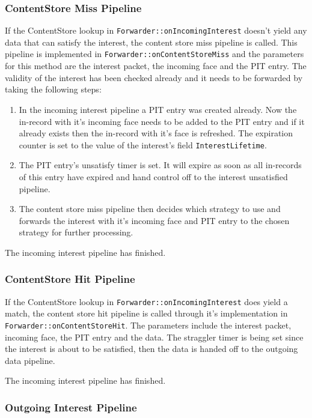 \subsubsection{ContentStore Miss Pipeline}

If the ContentStore lookup in \texttt{Forwarder::onIncomingInterest} doesn't yield any data that can satisfy the interest, the content store miss pipeline is called. This pipeline is implemented in \texttt{Forwarder::onContentStoreMiss} and the parameters for this method are the interest packet, the incoming face and the PIT entry. The validity of the interest has been checked already and it needs to be forwarded by taking the following steps:

\begin{enumerate}
\item In the incoming interest pipeline a PIT entry was created already. Now the in-record with it's incoming face needs to be added to the PIT entry and if it already exists then the in-record with it's face is refreshed. The expiration counter is set to the value of the interest's field \texttt{InterestLifetime}.
\item The PIT entry's unsatisfy timer is set. It will expire as soon as all in-records of this entry have expired and hand control off to the interest unsatisfied pipeline.
\item The content store miss pipeline then decides which strategy to use and forwards the interest with it's incoming face and PIT entry to the chosen strategy for further processing.
\end{enumerate}

The incoming interest pipeline has finished.

\subsubsection{ContentStore Hit Pipeline}

If the ContentStore lookup in \texttt{Forwarder::onIncomingInterest} does yield a match, the content store hit pipeline is called through it's implementation in \texttt{Forwarder::onContentStoreHit}. The parameters include the interest packet, incoming face, the PIT entry and the data. The straggler timer is being set since the interest is about to be satisfied, then the data is handed off to the outgoing data pipeline.

The incoming interest pipeline has finished.

\subsubsection{Outgoing Interest Pipeline}

